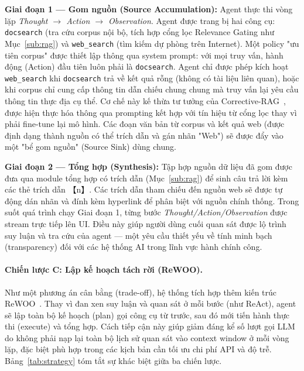 \documentclass[11pt]{article}
\begin{document}
\textbf{Giai đoạn 1 — Gom nguồn (Source Accumulation):} Agent thực thi vòng lặp \textit{Thought $\to$ Action $\to$ Observation}. Agent được trang bị hai công cụ: \texttt{docsearch} (tra cứu corpus nội bộ, tích hợp cổng lọc Relevance Gating như Mục~\ref{sub:rag}) và \texttt{web\_search} (tìm kiếm dự phòng trên Internet). Một policy "ưu tiên corpus" được thiết lập thông qua system prompt: với mọi truy vấn, hành động (Action) đầu tiên luôn phải là \texttt{docsearch}. Agent chỉ được phép kích hoạt \texttt{web\_search} khi \texttt{docsearch} trả về kết quả rỗng (không có tài liệu liên quan), hoặc khi corpus chỉ cung cấp thông tin dẫn chiếu chung chung mà truy vấn lại yêu cầu thông tin thực địa cụ thể. Cơ chế này kế thừa tư tưởng của Corrective-RAG~\citep{yan2024crag, asai2024selfrag}, được hiện thực hóa thông qua prompting kết hợp với tín hiệu từ cổng lọc thay vì phải fine-tune lại mô hình. Các đoạn văn bản từ corpus và kết quả web (được định dạng thành nguồn có thể trích dẫn và gán nhãn "Web") sẽ được đẩy vào một "bể gom nguồn" (Source Sink) dùng chung.

\textbf{Giai đoạn 2 — Tổng hợp (Synthesis):} Tập hợp nguồn dữ liệu đã gom được đưa qua module tổng hợp có trích dẫn (Mục~\ref{sub:rag}) để sinh câu trả lời kèm các thẻ trích dẫn 【n】. Các trích dẫn tham chiếu đến nguồn web sẽ được tự động dán nhãn và đính kèm hyperlink để phân biệt với nguồn chính thống. Trong suốt quá trình chạy Giai đoạn 1, từng bước \textit{Thought/Action/Observation} được stream trực tiếp lên UI. Điều này giúp người dùng cuối quan sát được lộ trình suy luận và tra cứu của agent — một yêu cầu thiết yếu về tính minh bạch (transparency) đối với các hệ thống AI trong lĩnh vực hành chính công.

\paragraph{Chiến lược C: Lập kế hoạch tách rời (ReWOO).}
Như một phương án cân bằng (trade-off), hệ thống tích hợp thêm kiến trúc ReWOO~\citep{xu2023rewoo}. Thay vì đan xen suy luận và quan sát ở mỗi bước (như ReAct), agent sẽ lập toàn bộ kế hoạch (plan) gọi công cụ từ trước, sau đó mới tiến hành thực thi (execute) và tổng hợp. Cách tiếp cận này giúp giảm đáng kể số lượt gọi LLM do không phải nạp lại toàn bộ lịch sử quan sát vào context window ở mỗi vòng lặp, đặc biệt phù hợp trong các kịch bản cần tối ưu chi phí API và độ trễ. Bảng~\ref{tab:strategy} tóm tắt sự khác biệt giữa ba chiến lược.
\end{document}
